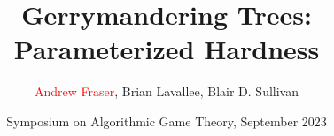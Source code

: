 \documentclass[table]{beamer}
\title{Gerrymandering Trees: Parameterized Hardness}
\author{\textcolor{red}{Andrew Fraser}, Brian Lavallee, Blair D. Sullivan}
\date{Symposium on Algorithmic Game Theory, September 2023}
\begin{document}
	\begin{frame}
		\titlepage
	\end{frame}

	
	
	
	
\end{document}
